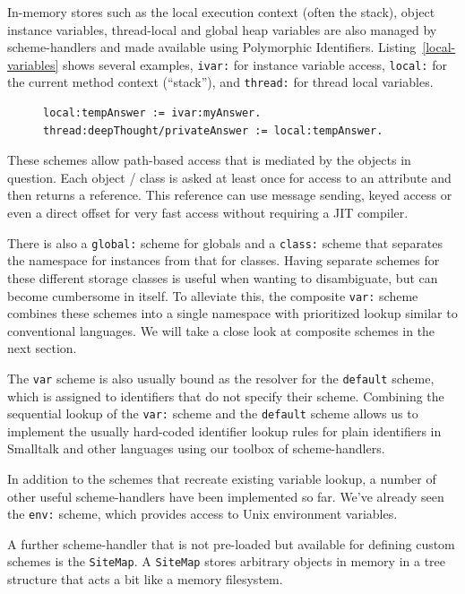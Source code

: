 \documentclass[preprint]{sigplanconf}
\begin{document}
In-memory stores such as the local execution context (often the stack), object instance
variables, thread-local and global heap variables are also managed by scheme-handlers
and made available using Polymorphic Identifiers.  Listing~\ref{local-variables} shows
several examples, {\tt ivar:} for instance variable access, {\tt local:} for the current
method context (``stack''), and {\tt thread:} for thread local variables.

\begin{figure}[htbp]
\begin{lstlisting}[style=numbers,label=local-variables,caption=Different memory variables.]
local:tempAnswer := ivar:myAnswer.
thread:deepThought/privateAnswer := local:tempAnswer.
\end{lstlisting}
\end{figure}

These schemes allow path-based access
that is mediated by the objects in question.   Each object / class is asked at least
once for access to an attribute and then returns a reference.   This reference can
use message sending, keyed access or even a direct offset for very fast
access without requiring a JIT compiler.

There is also a {\tt global:} scheme for globals and a {\tt class:} scheme that separates
the namespace for instances from that for classes.  Having separate schemes for
these different storage classes is useful when wanting to disambiguate,
but can become cumbersome in itself.  To alleviate this, the composite
{\tt var:} scheme combines these schemes into a single namespace
with prioritized lookup similar to conventional languages.  We will take
a close look at composite schemes in the next section.  

The {\tt var} scheme is also usually bound as the resolver for the {\tt default}
scheme, which is assigned to identifiers that do not specify their scheme.
Combining the sequential lookup of the {\tt var:} scheme and the {\tt default}
scheme allows us to implement the usually hard-coded identifier lookup
rules for plain identifiers in Smalltalk and other languages using
our toolbox of scheme-handlers.

In addition to the schemes that recreate existing variable lookup, a number
of other useful scheme-handlers have been implemented so far.  We've
already seen the {\tt env:} scheme, which provides access to Unix
environment variables.  

A further scheme-handler that is not pre-loaded but available for defining
custom schemes is the {\tt SiteMap}.  A {\tt SiteMap} stores arbitrary objects
in memory in a tree structure that acts a bit like a memory filesystem.
\end{document}
